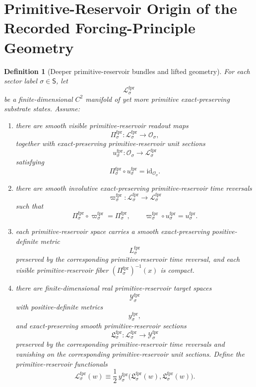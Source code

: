 \documentclass[11pt]{article}
\newcommand{\SectorSet}{\mathsf S}
\newcommand{\ObjClass}[1]{\mathcal O_{#1}}
\newcommand{\ForPrimSpace}[1]{\mathcal L_{#1}^{\mathrm{fpr}}}
\newcommand{\ForPrimRead}[1]{\Pi_{#1}^{\mathrm{fpr}}}
\newcommand{\ForPrimUnit}[1]{u_{#1}^{\mathrm{fpr}}}
\newcommand{\ForPrimTimeRev}[1]{\varpi_{#1}^{\mathrm{fpr}}}
\newcommand{\ForPrimMetric}[1]{L_{#1}^{\mathrm{fpr}}}
\newcommand{\ForPrimTarget}[1]{\mathcal Y_{#1}^{\mathrm{fpr}}}
\newcommand{\ForPrimTargetMetric}[1]{y_{#1}^{\mathrm{fpr}}}
\newcommand{\ForPrimSection}[1]{\mathfrak L_{#1}^{\mathrm{fpr}}}
\newcommand{\ForPrimFunctional}[1]{\mathscr L_{#1}^{\mathrm{fpr}}}
\newtheorem{definition}{Definition}
\begin{document}
\section{Primitive-Reservoir Origin of the Recorded Forcing-Principle Geometry}

\begin{definition}[Deeper primitive-reservoir bundles and lifted geometry]
\label{def:primitive_reservoir_geometry}
For each sector label \(\sigma\in\SectorSet\), let
\[
\ForPrimSpace{\sigma}
\]
be a finite-dimensional \(C^2\) manifold of yet more primitive exact-preserving substrate states. Assume:
\begin{enumerate}
    \item there are smooth visible primitive-reservoir readout maps
    \[
    \ForPrimRead{\sigma}:\ForPrimSpace{\sigma}\to\ObjClass{\sigma},
    \]
    together with exact-preserving primitive-reservoir unit sections
    \[
    \ForPrimUnit{\sigma}:\ObjClass{\sigma}\to\ForPrimSpace{\sigma}
    \]
    satisfying
    \[
    \ForPrimRead{\sigma}\circ\ForPrimUnit{\sigma}=\mathrm{id}_{\ObjClass{\sigma}}.
    \]
    \item there are smooth involutive exact-preserving primitive-reservoir time reversals
    \[
    \ForPrimTimeRev{\sigma}:\ForPrimSpace{\sigma}\to\ForPrimSpace{\sigma}
    \]
    such that
    \[
    \ForPrimRead{\sigma}\circ\ForPrimTimeRev{\sigma}=\ForPrimRead{\sigma},
    \qquad
    \ForPrimTimeRev{\sigma}\circ\ForPrimUnit{\sigma}=\ForPrimUnit{\sigma}.
    \]
    \item each primitive-reservoir space carries a smooth exact-preserving positive-definite metric
    \[
    \ForPrimMetric{\sigma}
    \]
    preserved by the corresponding primitive-reservoir time reversal, and each visible primitive-reservoir fiber \((\ForPrimRead{\sigma})^{-1}(x)\) is compact.
    \item there are finite-dimensional real primitive-reservoir target spaces
    \[
    \ForPrimTarget{\sigma}
    \]
    with positive-definite metrics
    \[
    \ForPrimTargetMetric{\sigma},
    \]
    and exact-preserving smooth primitive-reservoir sections
    \[
    \ForPrimSection{\sigma}:\ForPrimSpace{\sigma}\to\ForPrimTarget{\sigma}
    \]
    preserved by the corresponding primitive-reservoir time reversals and vanishing on the corresponding primitive-reservoir unit sections. Define the primitive-reservoir functionals
    \begin{equation}
    \ForPrimFunctional{\sigma}(w)\equiv \frac12\,
    \ForPrimTargetMetric{\sigma}\bigl(\ForPrimSection{\sigma}(w),\ForPrimSection{\sigma}(w)\bigr).

\end{equation}
\end{enumerate}
\end{definition}
\end{document}
